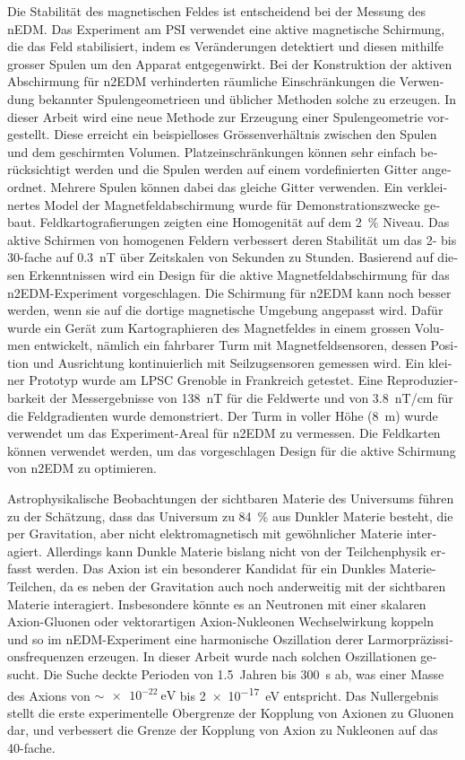 \begin{otherlanguage}{ngerman}
Die Stabilität des magnetischen Feldes ist entscheidend bei der Messung des nEDM\@.
Das Experiment am PSI verwendet eine aktive magnetische Schirmung, die das Feld stabilisiert, indem es Veränderungen detektiert und diesen mithilfe grosser Spulen um den Apparat entgegenwirkt.
Bei der Konstruktion der aktiven Abschirmung für n2EDM verhinderten räumliche Einschränkungen die Verwendung bekannter Spulengeometrieen und üblicher Methoden solche zu erzeugen.
In dieser Arbeit wird eine neue Methode zur Erzeugung einer Spulengeometrie vorgestellt. Diese erreicht ein beispielloses Grössenverhältnis zwischen den Spulen und dem geschirmten Volumen.
Platzeinschränkungen können sehr einfach berücksichtigt werden und die Spulen werden auf einem vordefinierten Gitter angeordnet. Mehrere Spulen können dabei das gleiche Gitter verwenden.
Ein verkleinertes Model der Magnetfeldabschirmung wurde für Demonstrationszwecke gebaut. Feldkartografierungen zeigten eine Homogenität auf dem \SI{2}{\percent} Niveau.
Das aktive Schirmen von homogenen Feldern verbessert deren Stabilität um das 2- bis 30-fache auf \SI{0.3}{nT} über  Zeitskalen von Sekunden zu Stunden.
Basierend auf diesen Erkenntnissen wird ein Design für die aktive Magnetfeldabschirmung für das n2EDM-Experiment vorgeschlagen.
Die Schirmung für n2EDM kann noch besser werden, wenn sie auf die dortige magnetische Umgebung angepasst wird.
Dafür wurde ein Gerät zum Kartographieren des Magnetfeldes in einem grossen Volumen entwickelt, nämlich ein fahrbarer Turm mit Magnetfeldsensoren, dessen Position und Ausrichtung kontinuierlich mit Seilzugsensoren gemessen wird.
Ein kleiner Prototyp wurde am LPSC Grenoble in Frankreich getestet. Eine Reproduzierbarkeit der Messergebnisse von \SI{138}{nT} für die Feldwerte und von \SI{3.8}{nT/cm} für die Feldgradienten wurde demonstriert.
Der Turm in voller Höhe  (\SI{8}{m}) wurde verwendet um das Experiment-Areal für n2EDM zu vermessen.
Die Feldkarten können verwendet werden, um das vorgeschlagen Design für die aktive Schirmung von n2EDM zu optimieren.

Astrophysikalische Beobachtungen der sichtbaren Materie des Universums führen zu der Schätzung, dass das Universum zu \SI{84}{\percent} aus Dunkler Materie besteht, die  per Gravitation, aber nicht elektromagnetisch mit gewöhnlicher Materie interagiert.
Allerdings kann Dunkle Materie bislang nicht von der Teilchenphysik erfasst werden.
Das Axion ist ein besonderer Kandidat für ein Dunkles Materie-Teilchen, da es neben der Gravitation auch noch anderweitig mit der sichtbaren Materie interagiert.
Insbesondere könnte es an Neutronen mit einer skalaren Axion-Gluonen oder vektorartigen Axion-Nukleonen Wechselwirkung koppeln und so im nEDM-Experiment eine harmonische Oszillation derer Larmorpräzissionsfrequenzen erzeugen.
In dieser Arbeit wurde nach solchen Oszillationen gesucht.
Die Suche deckte Perioden von \SI{1.5}{Jahren} bis \SI{300}{\second} ab, was einer Masse des Axions von $\sim \SI{e-22}{\electronvolt}$ bis \SI{2e-17}{\electronvolt} entspricht.
Das Nullergebnis stellt die erste experimentelle Obergrenze der Kopplung von Axionen zu Gluonen dar, und verbessert die Grenze der Kopplung von Axion zu Nukleonen auf das 40-fache.

\end{otherlanguage}

\endgroup

\vfill
